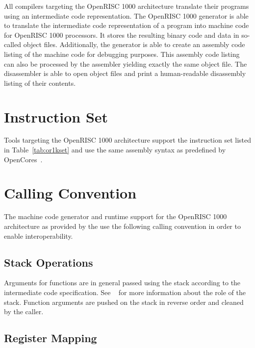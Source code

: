 All compilers targeting the OpenRISC 1000 architecture translate their programs using an intermediate code representation.
The OpenRISC 1000 generator is able to translate the intermediate code representation of a program into machine code for OpenRISC 1000 processors.
It stores the resulting binary code and data in so-called object files.
Additionally, the generator is able to create an assembly code listing of the machine code for debugging purposes.
This assembly code listing can also be processed by the assembler yielding exactly the same object file.
The disassembler is able to open object files and print a human-readable disassembly listing of their contents.
\seeobject\seecode

\section{Instruction Set}

Tools targeting the OpenRISC 1000 architecture support the instruction set listed in Table~\ref{tab:or1kset} and use the same assembly syntax as predefined by OpenCores~\cite{or1k:instructionset}.
\seeassembly


\section{Calling Convention}

The machine code generator and runtime support for the OpenRISC 1000 architecture as provided by the \ecs{} use the following calling convention in order to enable interoperability.

\subsection{Stack Operations}

Arguments for functions are in general passed using the stack according to the intermediate code specification.
See \Documentation{}~ for more information about the role of the stack.
Function arguments are pushed on the stack in reverse order and cleaned by the caller.

\subsection{Register Mapping}

